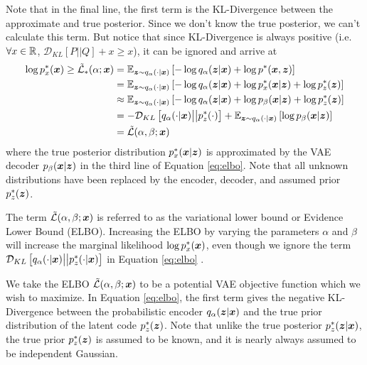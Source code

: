 Note that in the final line, the first term is the KL-Divergence between the approximate and true posterior. Since we don't know the true posterior, we can't calculate this term. But notice that since KL-Divergence is always positive (i.e. $\forall x \in \mathbb{R}$, $\mathcal{D}_{KL}[P \big|\big| Q] + x \geq x$), it can be ignored and arrive at
\begin{equation}
  \begin{split}
    \log p_x^* (\boldsymbol{x}) \geq \tilde{\mathcal{L}}_*(\alpha; \boldsymbol{x})  &= \mathbb{E}_{\boldsymbol{z}\sim q_\alpha(\cdot | \boldsymbol{x})}\left[ -\log q_\alpha(\boldsymbol{z} | \boldsymbol{x}) + \log p^*(\boldsymbol{x}, \boldsymbol{z}) \right] \\
    &= \mathbb{E}_{\boldsymbol{z}\sim q_\alpha(\cdot | \boldsymbol{x})}\left[ -\log q_\alpha(\boldsymbol{z} | \boldsymbol{x}) + \log p_x^*(\boldsymbol{x} | \boldsymbol{z}) + \log p_z^*(\boldsymbol{z}) \right] \\
  &\approx \mathbb{E}_{\boldsymbol{z}\sim q_\alpha(\cdot | \boldsymbol{x})}\left[ -\log q_\alpha(\boldsymbol{z} | \boldsymbol{x}) + \log p_\beta(\boldsymbol{x} | \boldsymbol{z}) + \log p_z^*(\boldsymbol{z}) \right] \\
  &= -\mathcal{D}_{KL}\left[ q_\alpha(\cdot | \boldsymbol{x}) \big|\big| p_z^*(\cdot) \right] + \mathbb{E}_{\boldsymbol{z}\sim q_\alpha(\cdot | \boldsymbol{x})}\left[ \log p_\beta(\boldsymbol{x} | \boldsymbol{z}) \right] \\
  &= \tilde{\mathcal{L}}(\alpha, \beta; \boldsymbol{x})
  \label{eq:elbo}
\end{split}
\end{equation}
where the true posterior distribution $p_x^*(\boldsymbol{x} | \boldsymbol{z})$ is approximated by the VAE decoder $p_\beta(\boldsymbol{x} | \boldsymbol{z})$ in the third line of Equation \ref{eq:elbo}. Note that all unknown distributions have been replaced by the encoder, decoder, and assumed prior $p_z^*(\boldsymbol{z})$.

The term $\tilde{\mathcal{L}}(\alpha, \beta; \boldsymbol{x})$ is referred to as the variational lower bound or Evidence Lower Bound (ELBO). Increasing the ELBO by varying the parameters $\alpha$ and $\beta$ will increase the marginal likelihood $\log p_x^*(\boldsymbol{x})$, even though we ignore the term $\mathcal{D}_{KL}\left[ q_\alpha (\cdot | \boldsymbol{x}) \big|\big| p_z^*(\cdot | \boldsymbol{x}) \right]$ in Equation \ref{eq:elbo} \cite{zhao2017}.

We take the ELBO $\tilde{\mathcal{L}}(\alpha,\beta; \boldsymbol{x})$ to be a potential VAE objective function which we wish to maximize. In Equation \ref{eq:elbo}, the first term gives the negative KL-Divergence between the probabilistic encoder $q_\alpha(\boldsymbol{z} | \boldsymbol{x})$ and the true prior distribution of the latent code $p_z^*(\boldsymbol{z})$. Note that unlike the true posterior $p_z^*(\boldsymbol{z} | \boldsymbol{x})$, the true prior $p_z^*(\boldsymbol{z})$ is assumed to be known, and it is nearly always assumed to be independent Gaussian. 

